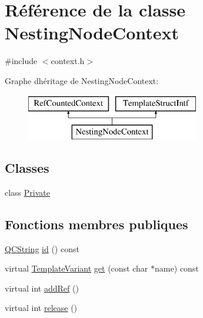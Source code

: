 \hypertarget{class_nesting_node_context}{}\section{Référence de la classe Nesting\+Node\+Context}
\label{class_nesting_node_context}


{\ttfamily \#include $<$context.\+h$>$}

Graphe d\textquotesingle{}héritage de Nesting\+Node\+Context\+:\begin{figure}[H]
\begin{center}
\leavevmode
\includegraphics[height=2.000000cm]{class_nesting_node_context}
\end{center}
\end{figure}
\subsection*{Classes}
\begin{DoxyCompactItemize}
\item 
class \hyperlink{class_nesting_node_context_1_1_private}{Private}
\end{DoxyCompactItemize}
\subsection*{Fonctions membres publiques}
\begin{DoxyCompactItemize}
\item 
\hyperlink{class_q_c_string}{Q\+C\+String} \hyperlink{class_nesting_node_context_a195ba26e40e84203fa12cb8166d8019f}{id} () const 
\item 
virtual \hyperlink{class_template_variant}{Template\+Variant} \hyperlink{class_nesting_node_context_a75b62fc38f4e5303ae6bb725e82acabd}{get} (const char $\ast$name) const 
\item 
virtual int \hyperlink{class_nesting_node_context_a4cd533625e9feace6c41d8191da089c4}{add\+Ref} ()
\item 
virtual int \hyperlink{class_nesting_node_context_a12ca8fb9a771ae6785dcb5bbc305a9ab}{release} ()
\end{DoxyCompactItemize}
